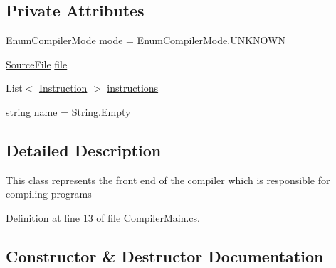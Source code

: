 \subsection*{Private Attributes}
\begin{DoxyCompactItemize}
\item 
\hyperlink{namespace_c_p_u___o_s___simulator_1_1_compiler_ada8d93b571fa15a0f2eac8c9647a89fe}{Enum\+Compiler\+Mode} \hyperlink{class_c_p_u___o_s___simulator_1_1_compiler_1_1_compiler_main_a064e52c2639d79cdec216d4ee7d384e9}{mode} = \hyperlink{namespace_c_p_u___o_s___simulator_1_1_compiler_ada8d93b571fa15a0f2eac8c9647a89fea696b031073e74bf2cb98e5ef201d4aa3}{Enum\+Compiler\+Mode.\+U\+N\+K\+N\+O\+W\+N}
\item 
\hyperlink{class_c_p_u___o_s___simulator_1_1_compiler_1_1_source_file}{Source\+File} \hyperlink{class_c_p_u___o_s___simulator_1_1_compiler_1_1_compiler_main_ac6a47299c228ea71c732f35572fa666f}{file}
\item 
List$<$ \hyperlink{class_c_p_u___o_s___simulator_1_1_c_p_u_1_1_instruction}{Instruction} $>$ \hyperlink{class_c_p_u___o_s___simulator_1_1_compiler_1_1_compiler_main_a0b0b37341f48e60f2ee769ea4ba760d2}{instructions}
\item 
string \hyperlink{class_c_p_u___o_s___simulator_1_1_compiler_1_1_compiler_main_a39370e54e39a32c7eb9dce2f9b49cefe}{name} = String.\+Empty
\end{DoxyCompactItemize}


\subsection{Detailed Description}
This class represents the front end of the compiler which is responsible for compiling programs 



Definition at line 13 of file Compiler\+Main.\+cs.



\subsection{Constructor \& Destructor Documentation}
\hypertarget{class_c_p_u___o_s___simulator_1_1_compiler_1_1_compiler_main_a50d01f6e7db4b9facb3fdc84e8566fd7}{}
